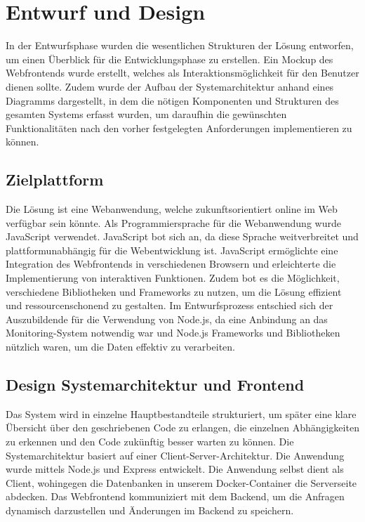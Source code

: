 \section{Entwurf und Design}\label{sec:entwurf-und-design}

In der Entwurfsphase wurden die wesentlichen Strukturen der Lösung entworfen, um einen Überblick für die Entwicklungsphase zu erstellen.
Ein Mockup des Webfrontends wurde erstellt, welches als Interaktionsmöglichkeit für den Benutzer dienen sollte.
Zudem wurde der Aufbau der Systemarchitektur anhand eines Diagramms dargestellt, in dem die nötigen Komponenten und Strukturen des gesamten Systems erfasst wurden, um daraufhin die gewünschten Funktionalitäten nach den vorher festgelegten Anforderungen implementieren zu können.

\subsection{Zielplattform}\label{subsec:zielplattform}

Die Lösung ist eine Webanwendung, welche zukunftsorientiert online im Web verfügbar sein könnte.
Als Programmiersprache für die Webanwendung wurde JavaScript verwendet.
JavaScript bot sich an, da diese Sprache weitverbreitet und plattformunabhängig für die Webentwicklung ist.
JavaScript ermöglichte eine Integration des Webfrontends in verschiedenen Browsern und erleichterte die Implementierung von interaktiven Funktionen.
Zudem bot es die Möglichkeit, verschiedene Bibliotheken und Frameworks zu nutzen, um die Lösung effizient und ressourcenschonend zu gestalten.
Im Entwurfsprozess entschied sich der Auszubildende für die Verwendung von Node.js, da eine Anbindung an das Monitoring-System notwendig war und Node.js Frameworks und Bibliotheken nützlich waren, um die Daten effektiv zu verarbeiten.

\subsection{Design Systemarchitektur und Frontend}\label{subsec:design-systemarchitektur-und-frontend}

Das System wird in einzelne Hauptbestandteile strukturiert, um später eine klare Übersicht über den geschriebenen Code zu erlangen, die einzelnen Abhängigkeiten zu erkennen und den Code zukünftig besser warten zu können.
Die Systemarchitektur basiert auf einer Client-Server-Architektur.
Die Anwendung wurde mittels Node.js und Express entwickelt.
Die Anwendung selbst dient als Client, wohingegen die Datenbanken in unserem Docker-Container die Serverseite abdecken.
Das Webfrontend kommuniziert mit dem Backend, um die Anfragen dynamisch darzustellen und Änderungen im Backend zu speichern.

